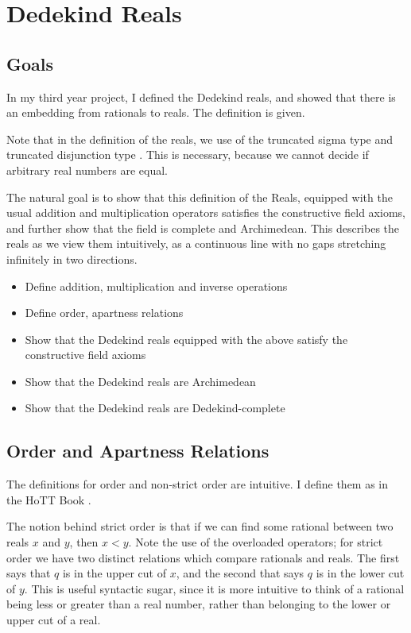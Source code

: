 \documentclass[ProjectReport]{subfiles}
\begin{document}
\section{Dedekind Reals}
\subsection{Goals}

In my third year project, I defined the Dedekind reals, and showed that there is an embedding from rationals to reals. The definition is given. 

\RealsCode

Note that in the definition of the reals, we use of the truncated sigma type \AgdaFunction{$\exists$} and truncated disjunction type \AgdaFunction{$\vee$}. This is necessary, because we cannot decide if arbitrary real numbers are equal. 

The natural goal is to show that this definition of the Reals, equipped with the usual addition and multiplication operators satisfies the constructive field axioms, and further show that the field is complete and Archimedean. This describes the reals as we view them intuitively, as a continuous line with no gaps stretching infinitely in two directions.

\begin{itemize}
    \item Define addition, multiplication and inverse operations
    \item Define order, apartness relations
    \item Show that the Dedekind reals equipped with the above satisfy the constructive field axioms
    \item Show that the Dedekind reals are Archimedean
    \item Show that the Dedekind reals are Dedekind-complete
\end{itemize}

\subsection{Order and Apartness Relations}

The definitions for order and non-strict order are intuitive. I define them as in the HoTT Book \cite[Section 11.2.1]{hottbook}. 

\RealsOrder

The notion behind strict order is that if we can find some rational between two reals $x$ and $y$, then $x < y$. Note the use of the overloaded operators; for strict order we have two distinct relations which compare rationals and reals. The first says that $q$ is in the upper cut of $x$, and the second that says $q$ is in the lower cut of $y$. This is useful syntactic sugar, since it is more intuitive to think of a rational being less or greater than a real number, rather than belonging to the lower or upper cut of a real. 
\end{document}
